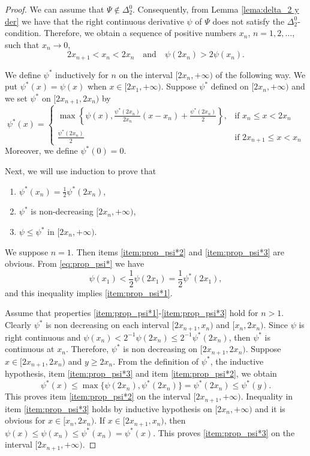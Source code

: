 \documentclass[twoside]{elsarticle}
\theoremstyle{remark}
\renewcommand{\leq}{\leqslant}
\renewcommand{\geq}{\geqslant}
\begin{document}
\begin{proof} We can assume that $\Psi \notin \Delta_2^0$.
Consequently, from Lemma \ref{lema:delta_2 y der} we have that the right continuous derivative $\psi$ of $\Psi$ does not satisfy the $\Delta_2^0$-condition.
Therefore, we obtain a sequence of positive numbers $x_n$, $n=1,2,\ldots$,  such that $x_n\to 0$,
\begin{equation}\label{eq:prop_psi*}2x_{n+1}<x_n<2x_n\quad\text{and}\quad \psi(2x_n)> 2\psi(x_n).
 \end{equation}

We define $\psi^*$ inductively for $n$ on the interval $[2x_n,+\infty)$ of the following way.
We put $\psi^*(x)=\psi(x)$ when  $x\in[ 2x_1,+\infty)$.
Suppose $\psi^*$ defined on $[2x_n,+\infty)$ and we set $\psi^*$ on $[2x_{n+1},2x_n)$ by
\[
 \psi^*(x)=\left\{
\begin{array}{cc}
  \max\left\{\psi(x),\frac{\psi^*(2x_n)}{2x_n}(x-x_n)+\frac{ \psi^*(2x_n)}{2}\right\},& \text{if } x_n\leq x<2x_n\\
   \frac{\psi^*(2x_n)}{2}& \text{if }2x_{n+1} \leq x<x_n
  \end{array}
\right.
\]
Moreover, we define $\psi^*(0)=0$.


Next, we will use induction  to prove that
\begin{enumerate}
 \item\label{item:prop_psi*1} $\psi^*(x_n)=\frac12\psi^*(2x_n)$,
 \item\label{item:prop_psi*2}  $\psi^*$ is non-decreasing $[2x_{n},+\infty)$,
 \item\label{item:prop_psi*3}   $\psi\leq \psi^*$ in  $[2x_{n},+\infty)$.
\end{enumerate}

We suppose $n=1$. Then items \ref{item:prop_psi*2} and \ref{item:prop_psi*3} are obvious. From \eqref{eq:prop_psi*} we have
\[\psi(x_1)<\frac12\psi(2x_1)=\frac12\psi^*(2x_1),\]
and this inequality implies \ref{item:prop_psi*1}.

Assume that properties \ref{item:prop_psi*1}-\ref{item:prop_psi*3} hold for $n>1$.  Clearly $\psi^*$ is non decreasing on each interval $[2x_{n+1},x_n)$ and $[x_n,2x_n)$. Since $\psi$ is right continuous and $\psi(x_n)<2^{-1}\psi(2x_n)\leq 2^{-1}\psi^*(2x_n)$, then $\psi^*$ is continuous at $x_n$. Therefore, $\psi^*$ is non decreasing on $[2x_{n+1},2x_n)$. Suppose $x\in[2x_{n+1},2x_n)$ and $y\geq 2x_n$.  From the definition of $\psi^*$, the inductive hypothesis, item \ref{item:prop_psi*3} and item \ref{item:prop_psi*2}, we obtain
%
\[\psi^*(x)\leq\max\{\psi(2x_n),\psi^*(2x_n)\}=\psi^*(2x_n)\leq\psi^*(y).\]
%
This proves item \ref{item:prop_psi*2} on the interval $[2x_{n+1},+\infty)$.
Inequality in item \ref{item:prop_psi*3} holds by inductive hypothesis on $[2x_n,+\infty)$
and it is obvious for  $x\in[x_n,2x_n)$.
If $ x\in[2x_{n+1},x_n)$, then $\psi(x)\leq\psi(x_n)\leq\psi^*(x_n)=\psi^*(x)$.
This proves  \ref{item:prop_psi*3} on the interval $[2x_{n+1},+\infty)$.


\end{proof}
\end{document}

